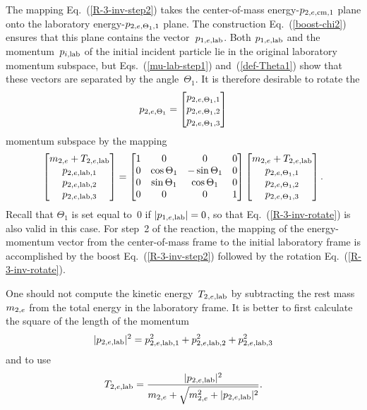 {The mapping Eq.~(\ref{R-3-inv-step2}) takes the
center-of-mass energy-$p_{2,e,\textrm{cm},1}$ plane onto the laboratory
energy-$p_{2,e,{\Theta_1},1}$ plane.  The construction Eq.~(\ref{boost-chi2})
ensures that this plane contains the vector~$p_{1,e,\textrm{lab}}$.  Both
$p_{1,e,\textrm{lab}}$ and the momentum~$p_{i,\textrm{lab}}$ of the initial incident particle
lie in the original laboratory momentum subspace, but Eqs.~(\ref{mu-lab-step1})
and~(\ref{def-Theta1}) show that these vectors are separated by
the angle~$\Theta_1$.  It is therefore desirable to rotate the
$$
  p_{2,e,{\Theta_1}} =
   \begin{bmatrix}
     p_{2,e,{\Theta_1},1} \\
    p_{2,e,{\Theta_1},2} \\
    p_{2,e,{\Theta_1},3}
   \end{bmatrix}
$$
momentum subspace by the mapping
\begin{equation}
  \begin{bmatrix}
    m_{2,e} + T_{2,e,\textrm{lab}} \\
    p_{2,e,\textrm{lab},1} \\
    p_{2,e,\textrm{lab},2} \\
    p_{2,e,\textrm{lab},3}
  \end{bmatrix}
   =
    \begin{bmatrix}
     1 & 0 & 0 & 0 \\
     0 & \cos \Theta_1 & -\sin \Theta_1 & 0 \\
     0  & \sin \Theta_1 & \cos \Theta_1 & 0 \\
     0  & 0 & 0 & 1
  \end{bmatrix}
  \begin{bmatrix}
    m_{2,e} + T_{2,e,\textrm{lab}} \\
    p_{2,e,{\Theta_1},1} \\
    p_{2,e,{\Theta_1},2} \\
    p_{2,e,{\Theta_1},3}
   \end{bmatrix}.
  \label{R-3-inv-rotate}
\end{equation}
Recall that $\Theta_1$ is set equal to~$0$ if $|p_{1,e,\textrm{lab}} | = 0$, so that 
Eq.~(\ref{R-3-inv-rotate}) is also valid in
this case.  For step~2 of the reaction, the mapping of the
energy-momentum vector from the center-of-mass frame
to the initial laboratory frame is accomplished by the boost
Eq.~(\ref{R-3-inv-step2}) followed by the rotation Eq.~(\ref{R-3-inv-rotate}).

One should not compute the kinetic energy~$T_{2,e,\textrm{lab}}$ by subtracting
the rest mass~$m_{2,e}$ from the total energy in the laboratory frame.
It is better to first calculate the square of the length of the momentum
$$
  |p_{2,e,\textrm{lab}}|^2 = p_{2,e,\textrm{lab},1}^2 + p_{2,e,\textrm{lab},2}^2 + p_{2,e,\textrm{lab},3}^2
$$
and to use
\begin{equation*}
  T_{2,e,\textrm{lab}} = \frac{|p_{2,e,\textrm{lab}}|^2 }
          {m_{2,e} + \sqrt{ m_{2,e}^2 + |p_{2,e,\textrm{lab}}|^2 }}.
\end{equation*}

}
